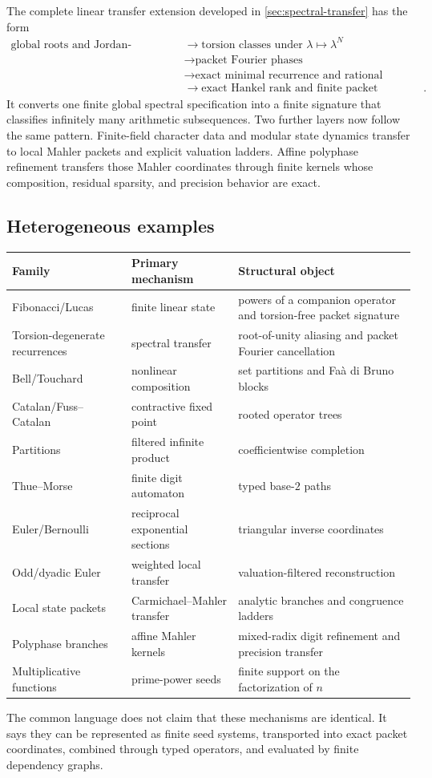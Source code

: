 \documentclass[11pt]{article}
\theoremstyle{definition}\newtheorem{definition}[theorem]{Definition}\newtheorem{example}[theorem]{Example}\newtheorem{construction}[theorem]{Construction}\newtheorem{algorithm}[theorem]{Algorithm}\newtheorem{conjecture}[theorem]{Conjecture}\newtheorem{problem}[theorem]{Problem}
\theoremstyle{remark}\newtheorem{remark}[theorem]{Remark}\newtheorem{boundary}[theorem]{Boundary}\newtheorem{certificate}[theorem]{Computational Certificate}\newtheorem{classical}[theorem]{Classical Input}\newtheorem{principle}[theorem]{Structural Principle}
\begin{document}
The complete linear transfer extension developed in \cref{sec:spectral-transfer} has the form
\[
 \boxed{
 \begin{aligned}
 \text{global roots and Jordan-polynomial data}
 &\longrightarrow
 \text{torsion classes under }\lambda\mapsto\lambda^N\\
 &\longrightarrow
 \text{packet Fourier phases}\\
 &\longrightarrow
 \text{exact minimal recurrence and rational denominator}\\
 &\longrightarrow
 \text{exact Hankel rank and finite packet signature}.
 \end{aligned}}
\]
It converts one finite global spectral specification into a finite signature that classifies infinitely many arithmetic subsequences.  Two further layers now follow the same pattern. Finite-field character data and modular state dynamics transfer to local Mahler packets and explicit valuation ladders. Affine polyphase refinement transfers those Mahler coordinates through finite kernels whose composition, residual sparsity, and precision behavior are exact.

\subsection{Heterogeneous examples}
\begin{center}
\begin{tabular}{L{.22\textwidth}L{.30\textwidth}L{.38\textwidth}}
\toprule
Family&Primary mechanism&Structural object\\
\midrule
Fibonacci/Lucas&finite linear state&powers of a companion operator and torsion-free packet signature\\
Torsion-degenerate recurrences&spectral transfer&root-of-unity aliasing and packet Fourier cancellation\\
Bell/Touchard&nonlinear composition&set partitions and Fa\`a di Bruno blocks\\
Catalan/Fuss--Catalan&contractive fixed point&rooted operator trees\\
Partitions&filtered infinite product&coefficientwise completion\\
Thue--Morse&finite digit automaton&typed base-$2$ paths\\
Euler/Bernoulli&reciprocal exponential sections&triangular inverse coordinates\\
Odd/dyadic Euler&weighted local transfer&valuation-filtered reconstruction\\
Local state packets&Carmichael--Mahler transfer&analytic branches and congruence ladders\\
Polyphase branches&affine Mahler kernels&mixed-radix digit refinement and precision transfer\\
Multiplicative functions&prime-power seeds&finite support on the factorization of $n$\\
\bottomrule
\end{tabular}
\end{center}
The common language does not claim that these mechanisms are identical.  It says they can be represented as finite seed systems, transported into exact packet coordinates, combined through typed operators, and evaluated by finite dependency graphs.
\end{document}
